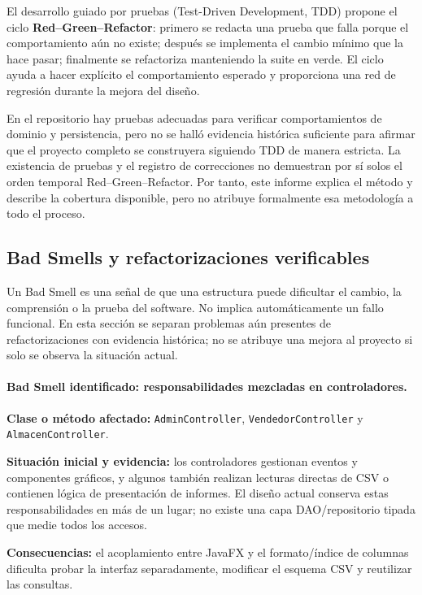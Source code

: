 El desarrollo guiado por pruebas (Test-Driven Development, TDD) propone el ciclo \textbf{Red--Green--Refactor}: primero se redacta una prueba que falla porque el comportamiento aún no existe; después se implementa el cambio mínimo que la hace pasar; finalmente se refactoriza manteniendo la suite en verde. El ciclo ayuda a hacer explícito el comportamiento esperado y proporciona una red de regresión durante la mejora del diseño.

En el repositorio hay pruebas adecuadas para verificar comportamientos de dominio y persistencia, pero no se halló evidencia histórica suficiente para afirmar que el proyecto completo se construyera siguiendo TDD de manera estricta. La existencia de pruebas y el registro de correcciones no demuestran por sí solos el orden temporal Red--Green--Refactor. Por tanto, este informe explica el método y describe la cobertura disponible, pero no atribuye formalmente esa metodología a todo el proceso.

\subsection{Bad Smells y refactorizaciones verificables}
\label{subsec:bad-smells}

Un Bad Smell es una señal de que una estructura puede dificultar el cambio, la comprensión o la prueba del software. No implica automáticamente un fallo funcional. En esta sección se separan problemas aún presentes de refactorizaciones con evidencia histórica; no se atribuye una mejora al proyecto si solo se observa la situación actual.

\paragraph{Bad Smell identificado: responsabilidades mezcladas en controladores.}
\textbf{Clase o método afectado:} \texttt{AdminController}, \texttt{VendedorController} y \texttt{AlmacenController}.

\textbf{Situación inicial y evidencia:} los controladores gestionan eventos y componentes gráficos, y algunos también realizan lecturas directas de CSV o contienen lógica de presentación de informes. El diseño actual conserva estas responsabilidades en más de un lugar; no existe una capa DAO/repositorio tipada que medie todos los accesos.

\textbf{Consecuencias:} el acoplamiento entre JavaFX y el formato/índice de columnas dificulta probar la interfaz separadamente, modificar el esquema CSV y reutilizar las consultas.

